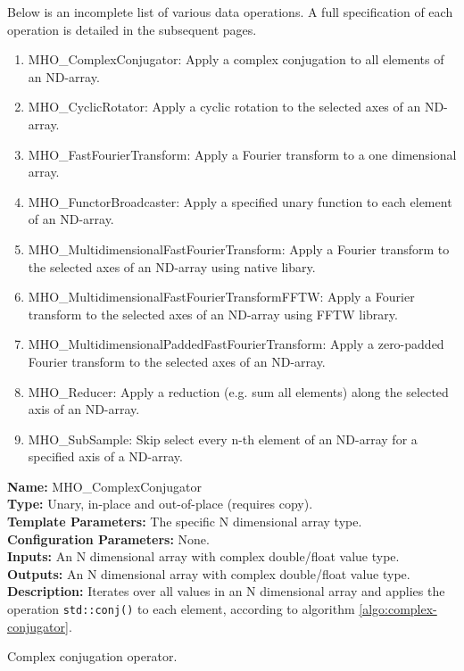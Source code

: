 Below is an incomplete list of various data operations. A full specification of each operation is detailed in the subsequent pages.
\begin{enumerate}
 \item MHO\_ComplexConjugator: Apply a complex conjugation to all elements of an ND-array.
 \item MHO\_CyclicRotator: Apply a cyclic rotation to the selected axes of an ND-array.
 \item MHO\_FastFourierTransform: Apply a Fourier transform to a one dimensional array.
 \item MHO\_FunctorBroadcaster: Apply a specified unary function to each element of an ND-array.
 \item MHO\_MultidimensionalFastFourierTransform: Apply a Fourier transform to the selected axes of an ND-array using native libary.
 \item MHO\_MultidimensionalFastFourierTransformFFTW: Apply a Fourier transform to the selected axes of an ND-array using FFTW library.
 \item MHO\_MultidimensionalPaddedFastFourierTransform: Apply a zero-padded Fourier transform to the selected axes of an ND-array.
 \item MHO\_Reducer: Apply a reduction (e.g. sum all elements) along the selected axis of an ND-array.
 \item MHO\_SubSample: Skip select every n-th element of an ND-array for a specified axis of a ND-array.
\end{enumerate}

\newpage

\noindent \textbf{Name:} MHO\_ComplexConjugator \\
\textbf{Type:} Unary, in-place and out-of-place (requires copy). \\
\textbf{Template Parameters:} The specific N dimensional array type.\\
\textbf{Configuration Parameters:} None.\\
\textbf{Inputs:} An N dimensional array with complex double/float value type. \\
\textbf{Outputs:} An N dimensional array with complex double/float value type. \\
\textbf{Description:} Iterates over all values in an N dimensional array and applies the operation \texttt{std::conj()} to each element, according to algorithm \ref{algo:complex-conjugator}. \\


\begin{algorithm}[h!]
  \caption{Complex conjugation operator.}
    \begin{algorithmic}[1]
    \end{algorithmic}
  \label{algo:complex-conjugator}
\end{algorithm}


